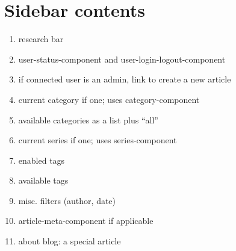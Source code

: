 \documentclass[a4paper, 11pt]{article}
\begin{document}
\section{Sidebar contents}
\begin{enumerate}
	\item research bar
	\item user-status-component and user-login-logout-component
	\item if connected user is an admin, link to create a new article
	\item current category if one; uses category-component
	\item available categories as a list plus “all”
	\item current series if one; uses series-component
	\item enabled tags
	\item available tags
	\item misc. filters (author, date)
	\item article-meta-component if applicable
	\item about blog: a special article
\end{enumerate}
\end{document}
